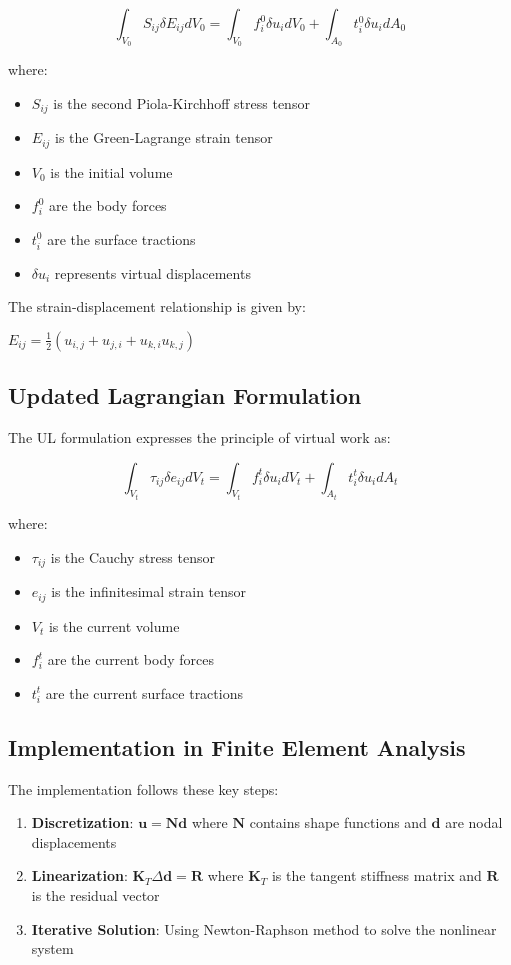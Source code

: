 \documentclass{article}
\begin{document}
$$ \int_{V_0} S_{ij} \delta E_{ij} dV_0 = \int_{V_0} f_i^0 \delta u_i dV_0 + \int_{A_0} t_i^0 \delta u_i dA_0 $$

where:
\begin{itemize}
    \item $S_{ij}$ is the second Piola-Kirchhoff stress tensor
    \item $E_{ij}$ is the Green-Lagrange strain tensor
    \item $V_0$ is the initial volume
    \item $f_i^0$ are the body forces
    \item $t_i^0$ are the surface tractions
    \item $\delta u_i$ represents virtual displacements
\end{itemize}

The strain-displacement relationship is given by:

$ E_{ij} = \frac{1}{2}(u_{i,j} + u_{j,i} + u_{k,i}u_{k,j}) $

\subsection{Updated Lagrangian Formulation}

The UL formulation expresses the principle of virtual work as:

$$ \int_{V_t} \tau_{ij} \delta e_{ij} dV_t = \int_{V_t} f_i^t \delta u_i dV_t + \int_{A_t} t_i^t \delta u_i dA_t $$

where:
\begin{itemize}
    \item $\tau_{ij}$ is the Cauchy stress tensor
    \item $e_{ij}$ is the infinitesimal strain tensor
    \item $V_t$ is the current volume
    \item $f_i^t$ are the current body forces
    \item $t_i^t$ are the current surface tractions
\end{itemize}

\subsection{Implementation in Finite Element Analysis}

The implementation follows these key steps:

\begin{enumerate}
    \item \textbf{Discretization}:
        $ \mathbf{u} = \mathbf{N}\mathbf{d} $
        where $\mathbf{N}$ contains shape functions and $\mathbf{d}$ are nodal displacements
    
    \item \textbf{Linearization}:
        $ \mathbf{K}_T \Delta\mathbf{d} = \mathbf{R} $
        where $\mathbf{K}_T$ is the tangent stiffness matrix and $\mathbf{R}$ is the residual vector
    
    \item \textbf{Iterative Solution}:
        Using Newton-Raphson method to solve the nonlinear system
\end{enumerate}
\end{document}
